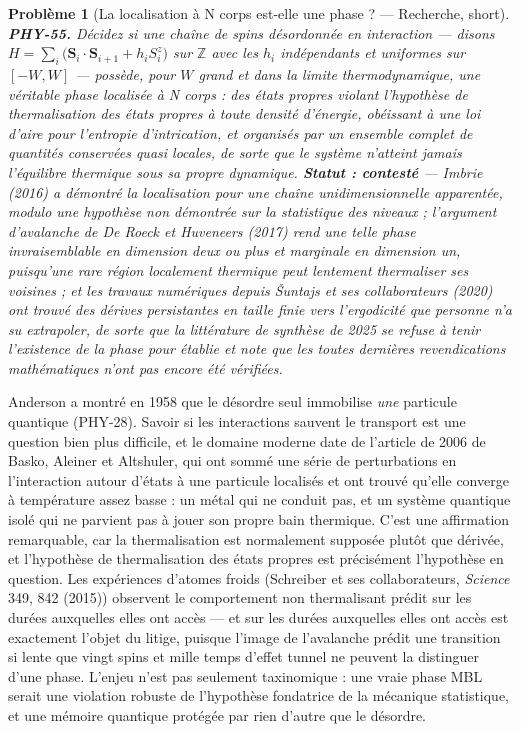 \documentclass[11pt]{article}
\newtheorem{problem}{Problème}
\begin{document}
\begin{problem}[{La localisation à N corps est-elle une phase ? --- Recherche, short}]
\textbf{PHY-55.} Décidez si une chaîne de spins désordonnée en interaction ---
disons $H = \sum_i \bigl(\mathbf{S}_i\cdot\mathbf{S}_{i+1} + h_i S^{z}_i\bigr)$ sur
$\mathbb{Z}$ avec les $h_i$ indépendants et uniformes sur $[-W,W]$ --- possède, pour $W$ grand
et dans la limite thermodynamique, une véritable phase localisée à N corps : des états propres
violant l'hypothèse de thermalisation des états propres à toute densité d'énergie, obéissant à une
loi d'aire pour l'entropie d'intrication, et organisés par un ensemble complet de quantités
conservées quasi locales, de sorte que le système n'atteint jamais l'équilibre thermique sous sa
propre dynamique. \textbf{Statut : contesté} --- Imbrie (2016) a démontré la localisation pour une
chaîne unidimensionnelle apparentée, modulo une hypothèse non démontrée sur la statistique des
niveaux ; l'argument d'avalanche de De Roeck et Huveneers (2017) rend une telle phase
invraisemblable en dimension deux ou plus et marginale en dimension un, puisqu'une rare région
localement thermique peut lentement thermaliser ses voisines ; et les travaux numériques depuis
\v{S}untajs et ses collaborateurs (2020) ont trouvé des dérives persistantes en taille finie vers
l'ergodicité que personne n'a su extrapoler, de sorte que la littérature de synthèse de 2025 se
refuse à tenir l'existence de la phase pour établie et note que les toutes dernières
revendications mathématiques n'ont pas encore été vérifiées.
\end{problem}

\noindent Anderson a montré en 1958 que le désordre seul immobilise \textit{une} particule
quantique (PHY-28). Savoir si les interactions sauvent le transport est une question bien plus
difficile, et le domaine moderne date de l'article de 2006 de Basko, Aleiner et Altshuler, qui ont
sommé une série de perturbations en l'interaction autour d'états à une particule localisés et ont
trouvé qu'elle converge à température assez basse : un métal qui ne conduit pas, et un système
quantique isolé qui ne parvient pas à jouer son propre bain thermique. C'est une affirmation
remarquable, car la thermalisation est normalement supposée plutôt que dérivée, et l'hypothèse de
thermalisation des états propres est précisément l'hypothèse en question. Les expériences d'atomes
froids (Schreiber et ses collaborateurs, \textit{Science} 349, 842 (2015)) observent le comportement
non thermalisant prédit sur les durées auxquelles elles ont accès --- et \og{} sur les durées auxquelles
elles ont accès \fg{} est exactement l'objet du litige, puisque l'image de l'avalanche prédit une
transition si lente que vingt spins et mille temps d'effet tunnel ne peuvent la distinguer d'une
phase. L'enjeu n'est pas seulement taxinomique : une vraie phase MBL serait une violation robuste
de l'hypothèse fondatrice de la mécanique statistique, et une mémoire quantique protégée par rien
d'autre que le désordre.
\end{document}
